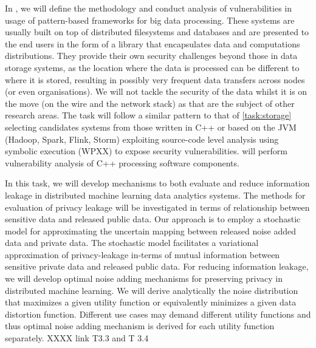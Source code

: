 \begin{Workpackage}{\thewpno}
\begin{Task}
 \TaskResults{%
 }
 \TaskHeader{}
 In \theTask, we will define the methodology and conduct analysis of vulnerabilities in usage of pattern-based frameworks for big data processing. These systems are usually built on top of distributed filesystems and databases and are presented to the end users in the form of a library that encapsulates data and computations distributions. They provide their own security challenges beyond those in data storage systems, as the location where the data is processed can be different to where it is stored, resulting in possibly very frequent data transfers across nodes (or even organisations). We will not tackle the security of the data whilst it is on the move (on the wire and the network stack) as that are the subject of other research areas.  The task will follow a similar pattern to that of \ref{task:storage} selecting candidates systems from those written in C++ or based on the JVM (Hadoop, Spark, Flink, Storm) exploiting source-code level analysis using symbolic execution (WPXX) to expose security vulnerabilities.
\UCM will perform vulnerability analysis of C++ processing software components.
\end{Task}
 
\begin{Task}
  
  \TaskResults{%
  }
  \TaskHeader{}
  In this task, we will develop mechanisms to both evaluate and reduce information leakage in distributed machine learning data analytics systems. The methods for evaluation of privacy leakage will be investigated in terms of relationship between sensitive data and released public data. Our approach is to employ a stochastic model for approximating the uncertain mapping between released noise added data and private data. The stochastic model facilitates a variational approximation of privacy-leakage in-terms of mutual information between sensitive private data and released public data. For reducing information leakage, we will develop optimal noise adding mechanisms for preserving privacy in distributed machine learning. We will derive analytically the noise distribution that maximizes a given utility function or equivalently minimizes a given data distortion function. Different use cases may demand different utility functions and thus optimal noise adding mechanism is derived for each utility function separately.    XXXX link T3.3 and T 3.4
 \end{Task}


\end{Workpackage}
